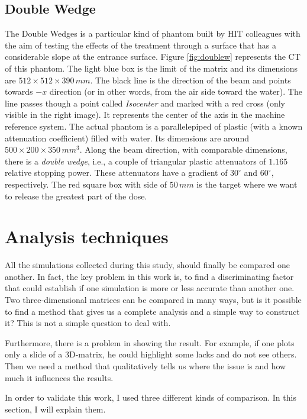 \documentclass[12pt, a4paper, twoside]{book}
\begin{document}
\subsection{Double Wedge} 
The Double Wedges is a particular kind of phantom built by HIT colleagues with the aim of testing the effects of the treatment through a surface that has a considerable slope at the entrance surface. 
Figure \ref{fig:doublew} represents the CT of this phantom. The light blue box is the limit of the matrix and its dimensions are $512\times512\times390\,mm$. The black line is the direction of the beam and points towards $-x$ direction (or in other words, from the air side toward the water). The line passes though a point called \emph{Isocenter} and marked with a red cross (only visible in the right image). It represents the center of the axis in the machine reference system.
The actual phantom is a parallelepiped of plastic (with a known attenuation coefficient) filled with water. Its dimensions are around $500\times200\times350\,mm^3$. Along the beam direction, with comparable dimensions, there is a \emph{double wedge}, i.e., a couple of triangular plastic attenuators of $1.165$ relative stopping power. These attenuators have a gradient of $30^\circ$ and $60^\circ$, respectively.
The red square box with side of $50\,mm$ is the target where we want to release the greatest part of the dose. 

\section{Analysis techniques}
All the simulations collected during this study, should finally be compared one another. 
In fact, the key problem in this work is, to find a discriminating factor that could establish if one simulation is more or less accurate than another one. Two three-dimensional matrices can be compared in many ways, but is it possible to find a method that gives us a complete analysis and a simple way to construct it?
This is not a simple question to deal with. 

Furthermore, there is a problem in showing the result. For example, if one plots only a slide of a 3D-matrix, he could highlight some lacks and do not see others. Then we need a method that qualitatively tells us where the issue is and how much it influences the results.

In order to validate this work, I used three different kinds of comparison. In this section, I will explain them.
\end{document}
